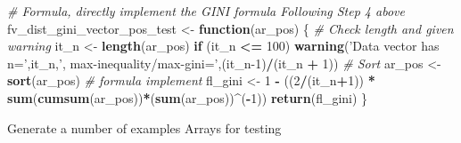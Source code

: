 \documentclass[
]{book}
\newenvironment{Shaded}{\begin{snugshade}}{\end{snugshade}}
\newcommand{\CommentTok}[1]{\textcolor[rgb]{0.56,0.35,0.01}{\textit{#1}}}
\newcommand{\ControlFlowTok}[1]{\textcolor[rgb]{0.13,0.29,0.53}{\textbf{#1}}}
\newcommand{\DecValTok}[1]{\textcolor[rgb]{0.00,0.00,0.81}{#1}}
\newcommand{\KeywordTok}[1]{\textcolor[rgb]{0.13,0.29,0.53}{\textbf{#1}}}
\newcommand{\NormalTok}[1]{#1}
\newcommand{\OperatorTok}[1]{\textcolor[rgb]{0.81,0.36,0.00}{\textbf{#1}}}
\newcommand{\StringTok}[1]{\textcolor[rgb]{0.31,0.60,0.02}{#1}}
\begin{document}
\begin{Shaded}
\begin{Highlighting}[]
\CommentTok{# Formula, directly implement the GINI formula Following Step 4 above}
\NormalTok{fv_dist_gini_vector_pos_test <-}\StringTok{ }\ControlFlowTok{function}\NormalTok{(ar_pos) \{}
  \CommentTok{# Check length and given warning}
\NormalTok{  it_n <-}\StringTok{ }\KeywordTok{length}\NormalTok{(ar_pos)}
  \ControlFlowTok{if}\NormalTok{ (it_n }\OperatorTok{<=}\StringTok{ }\DecValTok{100}\NormalTok{)  }\KeywordTok{warning}\NormalTok{(}\StringTok{'Data vector has n='}\NormalTok{,it_n,}\StringTok{', max-inequality/max-gini='}\NormalTok{,(it_n}\DecValTok{-1}\NormalTok{)}\OperatorTok{/}\NormalTok{(it_n }\OperatorTok{+}\StringTok{ }\DecValTok{1}\NormalTok{))}
  \CommentTok{# Sort}
\NormalTok{  ar_pos <-}\StringTok{ }\KeywordTok{sort}\NormalTok{(ar_pos)}
  \CommentTok{# formula implement}
\NormalTok{  fl_gini <-}\StringTok{ }\DecValTok{1} \OperatorTok{-}\StringTok{ }\NormalTok{((}\DecValTok{2}\OperatorTok{/}\NormalTok{(it_n}\OperatorTok{+}\DecValTok{1}\NormalTok{)) }\OperatorTok{*}\StringTok{ }\KeywordTok{sum}\NormalTok{(}\KeywordTok{cumsum}\NormalTok{(ar_pos))}\OperatorTok{*}\NormalTok{(}\KeywordTok{sum}\NormalTok{(ar_pos))}\OperatorTok{^}\NormalTok{(}\OperatorTok{-}\DecValTok{1}\NormalTok{))}
  \KeywordTok{return}\NormalTok{(fl_gini)}
\NormalTok{\}}
\end{Highlighting}
\end{Shaded}

Generate a number of examples Arrays for testing
\end{document}
